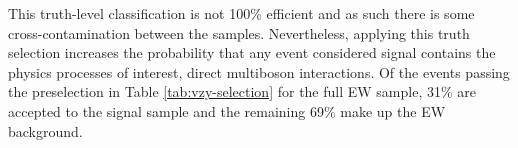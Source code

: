 This truth-level classification is not 100\% efficient and as such there is some
cross-contamination between the samples. Nevertheless, applying this truth
selection increases the probability that any event considered signal contains
the physics processes of interest, direct multiboson interactions.  Of the
events passing the preselection in Table \ref{tab:vzy-selection} for the full
\ac{EW} \Zyjj sample, 31\% are accepted to the \VZy signal sample and the
remaining 69\% make up the \ac{EW} background.
